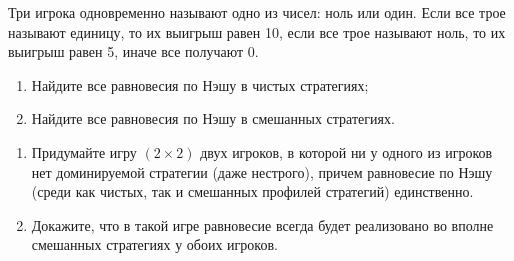 \begin{problem}
Три игрока одновременно называют одно из чисел: ноль или один. Если все трое называют единицу, то их выигрыш равен 10, если все трое называют ноль, то их выигрыш равен 5, иначе все получают 0.\par
\begin{enumerate}
\item 	Найдите все равновесия по Нэшу в чистых стратегиях;\par
\item 	Найдите все равновесия по Нэшу в смешанных стратегиях.
\end{enumerate}


\begin{sol}

\end{sol}
\end{problem}



\begin{problem}
\begin{source}
\cite{polisci:lectures}
\end{source}
 \begin{enumerate} \item Придумайте игру  $\left(2\times 2\right)$  двух игроков, в которой ни у одного из игроков нет доминируемой стратегии (даже нестрого), причем равновесие по Нэшу (среди как чистых, так и смешанных профилей стратегий)  единственно.\par
\item 	Докажите, что в такой игре равновесие всегда будет реализовано во вполне смешанных стратегиях у обоих игроков.
\end{enumerate}


\begin{sol}

\end{sol}
\end{problem}



